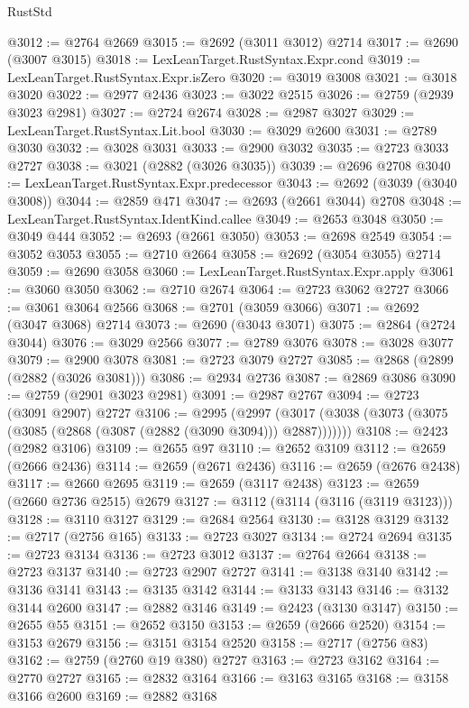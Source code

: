 \begin{lexlean}{RustStd}
\begin{coremodule}
@3012 := @2764 @2669
@3015 := @2692 (@3011 @3012) @2714
@3017 := @2690 (@3007 @3015)
@3018 := LexLeanTarget.RustSyntax.Expr.cond
@3019 := LexLeanTarget.RustSyntax.Expr.isZero
@3020 := @3019 @3008
@3021 := @3018 @3020
@3022 := @2977 @2436
@3023 := @3022 @2515
@3026 := @2759 (@2939 @3023 @2981)
@3027 := @2724 @2674
@3028 := @2987 @3027
@3029 := LexLeanTarget.RustSyntax.Lit.bool
@3030 := @3029 @2600
@3031 := @2789 @3030
@3032 := @3028 @3031
@3033 := @2900 @3032
@3035 := @2723 @3033 @2727
@3038 := @3021 (@2882 (@3026 @3035))
@3039 := @2696 @2708
@3040 := LexLeanTarget.RustSyntax.Expr.predecessor
@3043 := @2692 (@3039 (@3040 @3008))
@3044 := @2859 @471
@3047 := @2693 (@2661 @3044) @2708
@3048 := LexLeanTarget.RustSyntax.IdentKind.callee
@3049 := @2653 @3048
@3050 := @3049 @444
@3052 := @2693 (@2661 @3050)
@3053 := @2698 @2549
@3054 := @3052 @3053
@3055 := @2710 @2664
@3058 := @2692 (@3054 @3055) @2714
@3059 := @2690 @3058
@3060 := LexLeanTarget.RustSyntax.Expr.apply
@3061 := @3060 @3050
@3062 := @2710 @2674
@3064 := @2723 @3062 @2727
@3066 := @3061 @3064 @2566
@3068 := @2701 (@3059 @3066)
@3071 := @2692 (@3047 @3068) @2714
@3073 := @2690 (@3043 @3071)
@3075 := @2864 (@2724 @3044)
@3076 := @3029 @2566
@3077 := @2789 @3076
@3078 := @3028 @3077
@3079 := @2900 @3078
@3081 := @2723 @3079 @2727
@3085 := @2868 (@2899 (@2882 (@3026 @3081)))
@3086 := @2934 @2736
@3087 := @2869 @3086
@3090 := @2759 (@2901 @3023 @2981)
@3091 := @2987 @2767
@3094 := @2723 (@3091 @2907) @2727
@3106 := @2995
    (@2997 (@3017 (@3038 (@3073 (@3075 (@3085 (@2868 (@3087 (@2882 (@3090 @3094))) @2887)))))))
@3108 := @2423 (@2982 @3106)
@3109 := @2655 @97
@3110 := @2652 @3109
@3112 := @2659 (@2666 @2436)
@3114 := @2659 (@2671 @2436)
@3116 := @2659 (@2676 @2438)
@3117 := @2660 @2695
@3119 := @2659 (@3117 @2438)
@3123 := @2659 (@2660 @2736 @2515) @2679
@3127 := @3112 (@3114 (@3116 (@3119 @3123)))
@3128 := @3110 @3127
@3129 := @2684 @2564
@3130 := @3128 @3129
@3132 := @2717 (@2756 @165)
@3133 := @2723 @3027
@3134 := @2724 @2694
@3135 := @2723 @3134
@3136 := @2723 @3012
@3137 := @2764 @2664
@3138 := @2723 @3137
@3140 := @2723 @2907 @2727
@3141 := @3138 @3140
@3142 := @3136 @3141
@3143 := @3135 @3142
@3144 := @3133 @3143
@3146 := @3132 @3144 @2600
@3147 := @2882 @3146
@3149 := @2423 (@3130 @3147)
@3150 := @2655 @55
@3151 := @2652 @3150
@3153 := @2659 (@2666 @2520)
@3154 := @3153 @2679
@3156 := @3151 @3154 @2520
@3158 := @2717 (@2756 @83)
@3162 := @2759 (@2760 @19 @380) @2727
@3163 := @2723 @3162
@3164 := @2770 @2727
@3165 := @2832 @3164
@3166 := @3163 @3165
@3168 := @3158 @3166 @2600
@3169 := @2882 @3168

\end{coremodule}
\end{lexlean}
